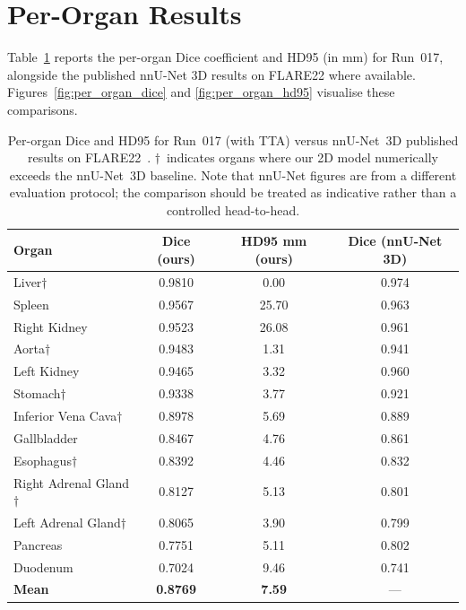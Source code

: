 \section{Per-Organ Results}

Table~\ref{tab:per_organ} reports the per-organ Dice coefficient and HD95 (in mm) for Run~017,
alongside the published nnU-Net 3D results on FLARE22 where available. Figures~\ref{fig:per_organ_dice}
and \ref{fig:per_organ_hd95} visualise these comparisons.

\begin{table}[h!]
\centering
\caption{Per-organ Dice and HD95 for Run~017 (with TTA) versus nnU-Net~3D published
         results on FLARE22~\cite{isensee2021}. $\dagger$~indicates organs where our
         2D model numerically exceeds the nnU-Net~3D baseline. Note that nnU-Net figures
         are from a different evaluation protocol; the comparison should be treated as
         indicative rather than a controlled head-to-head.}
\label{tab:per_organ}
\begin{tabular}{l c c c}
\toprule
\textbf{Organ} & \textbf{Dice (ours)} & \textbf{HD95 mm (ours)} & \textbf{Dice (nnU-Net 3D)} \\
\midrule
Liver$\dagger$              & 0.9810 & \phantom{0}0.00 & 0.974 \\
Spleen                      & 0.9567 & 25.70           & 0.963 \\
Right Kidney                & 0.9523 & 26.08           & 0.961 \\
Aorta$\dagger$              & 0.9483 & \phantom{0}1.31 & 0.941 \\
Left Kidney                 & 0.9465 & \phantom{0}3.32 & 0.960 \\
Stomach$\dagger$            & 0.9338 & \phantom{0}3.77 & 0.921 \\
Inferior Vena Cava$\dagger$ & 0.8978 & \phantom{0}5.69 & 0.889 \\
Gallbladder                 & 0.8467 & \phantom{0}4.76 & 0.861 \\
Esophagus$\dagger$          & 0.8392 & \phantom{0}4.46 & 0.832 \\
Right Adrenal Gland$\dagger$& 0.8127 & \phantom{0}5.13 & 0.801 \\
Left Adrenal Gland$\dagger$ & 0.8065 & \phantom{0}3.90 & 0.799 \\
Pancreas                    & 0.7751 & \phantom{0}5.11 & 0.802 \\
Duodenum                    & 0.7024 & \phantom{0}9.46 & 0.741 \\
\midrule
\textbf{Mean}               & \textbf{0.8769} & \textbf{7.59} & --- \\
\bottomrule
\end{tabular}
\end{table}

